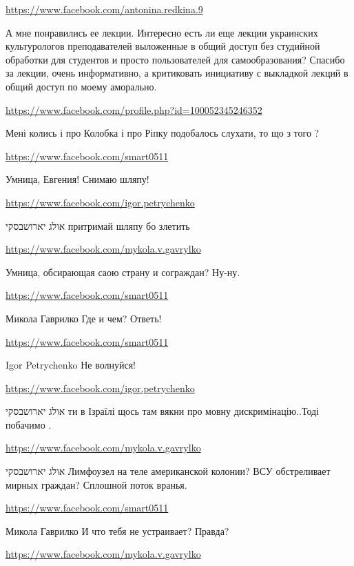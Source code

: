 \documentclass[a4paper,11pt]{extreport}
\begin{document}
\begin{itemize}
\begin{itemize}
\url{https://www.facebook.com/antonina.redkina.9}

А мне понравились ее лекции. Интересно есть ли еще лекции украинских культурологов преподавателей выложенные в общий доступ без студийной обработки для студентов и просто пользователей для самообразования? Спасибо за лекции, очень информативно, а критиковать инициативу с выкладкой лекций в общий доступ по моему аморально.

\url{https://www.facebook.com/profile.php?id=100052345246352}

Мені колись і про Колобка і про Ріпку подобалось слухати, то що з того ?

\end{itemize}
\url{https://www.facebook.com/smart0511}

Умница, Евгения! Снимаю шляпу!

\begin{itemize}
\url{https://www.facebook.com/igor.petrychenko}

אולג יארושבסקי притримай шляпу бо злетить

\url{https://www.facebook.com/mykola.v.gavrylko}

Умница, обсирающая саою страну и сограждан? Ну-ну.

\url{https://www.facebook.com/smart0511}

Микола Гаврилко Где и чем? Ответь!

\url{https://www.facebook.com/smart0511}

Igor Petrychenko Не волнуйся!

\url{https://www.facebook.com/igor.petrychenko}

אולג יארושבסקי ти в Ізраїлі щось там вякни про мовну дискримінацію..Тоді побачимо .

\url{https://www.facebook.com/mykola.v.gavrylko}

אולג יארושבסקי Лимфоузел на теле американской колонии? ВСУ обстреливает мирных граждан? Сплошной поток вранья.

\url{https://www.facebook.com/smart0511}

Микола Гаврилко И что тебя не устраивает? Правда?

\url{https://www.facebook.com/mykola.v.gavrylko}


\end{itemize}
\end{itemize}
\end{document}
